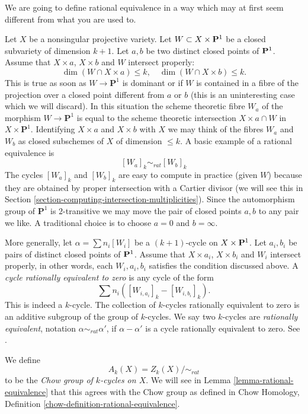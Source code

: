 \noindent
We are going to define rational equivalence in a way which may at first
seem different from what you are used to.

\medskip\noindent
Let $X$ be a nonsingular projective variety. Let $W \subset X \times {\bf P}^1$
be a closed subvariety of dimension $k + 1$. Let $a, b$ be two distinct closed
points of ${\bf P}^1$. Assume that $X \times a$, $X \times b$ and $W$ intersect properly:
$$
\dim (W \cap X \times a) \leq k,\quad
\dim (W \cap X \times b) \leq k.
$$
This is true as soon as $W \to \mathbf{P}^1$ is dominant or if $W$ is
contained in a fibre of the projection over a closed point different from
$a$ or $b$ (this is an uninteresting case which we will discard). In this
situation the scheme theoretic fibre $W_a$ of the morphism
$W \to \mathbf{P}^1$ is equal to the scheme theoretic intersection
$X \times a \cap W$ in $X \times \mathbf{P}^1$. Identifying $X \times a$
and $X \times b$ with $X$ we may think of the fibres $W_a$ and $W_b$
as closed subschemes of $X$ of dimension $\leq k$. A basic example of a
rational equivalence is
$$
[W_a]_k \sim_{rat} [W_b]_k
$$
The cycles $[W_a]_k$ and $[W_b]_k$ are easy to compute in practice
(given $W$) because they are obtained by proper intersection with
a Cartier divisor (we will see this in
Section \ref{section-computing-intersection-multiplicities}).
Since the automorphism group of $\mathbf{P}^1$ is $2$-transitive we may
move the pair of closed points $a, b$ to any pair we like. A traditional
choice is to choose $a = 0$ and $b = \infty$.

\medskip\noindent
More generally, let $\alpha = \sum n_i [W_i]$ be a $(k + 1)$-cycle on
$X \times {\bf P}^1$.  Let $a_i, b_i$ be pairs of distinct closed points of
${\bf P}^1$. Assume that $X \times a_i$, $X \times b_i$ and $W_i$ intersect
properly, in other words, each $W_i, a_i, b_i$ satisfies the condition
discussed above. A {\it cycle rationally equivalent to zero} is any cycle
of the form
$$
\sum n_i([W_{i, a_i}]_k - [W_{i, b_i}]_k).
$$
This is indeed a $k$-cycle. The collection of $k$-cycles rationally
equivalent to zero is an additive subgroup of the group of $k$-cycles.
We say two $k$-cycles are {\it rationally equivalent}, notation
$\alpha \sim_{rat} \alpha'$, if $\alpha - \alpha'$ is a cycle rationally
equivalent to zero. See \cite[Chapter I]{F}.

\medskip\noindent
We define
$$
A_k(X) = Z_k(X)/ \sim_{rat}
$$
to be the {\it Chow group of $k$-cycles on $X$}. We will see in
Lemma \ref{lemma-rational-equivalence}
that this agrees with the Chow group as defined in
Chow Homology, Definition \ref{chow-definition-rational-equivalence}.


